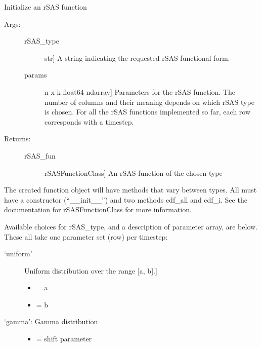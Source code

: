 \documentclass[letterpaper,10pt,english]{sphinxmanual}
\begin{document}

\begin{fulllineitems}
\label{index:rsas.create_function}
Initialize an rSAS function
\begin{description}
\item[{Args:}] \leavevmode\begin{description}
\item[{rSAS\_type}] \leavevmode{[}str{]}
A string indicating the requested rSAS functional form.

\item[{params}] \leavevmode{[}n x k float64 ndarray{]}
Parameters for the rSAS function. The number of columns and 
their meaning depends on which rSAS type is chosen. For all the rSAS 
functions implemented so far, each row corresponds with a timestep.

\end{description}

\item[{Returns:}] \leavevmode\begin{description}
\item[{rSAS\_fun}] \leavevmode{[}rSASFunctionClass{]}
An rSAS function of the chosen type

\end{description}

\end{description}

The created function object will have methods that vary between types. All
must have a constructor (``\_\_init\_\_'') and two methods cdf\_all and cdf\_i. See
the documentation for rSASFunctionClass for more information.

Available choices for rSAS\_type, and a description of parameter array, are below.
These all take one parameter set (row) per timestep:
\begin{description}
\item[{`uniform'}] \leavevmode{[}Uniform distribution over the range {[}a, b{]}.{]}\begin{itemize}
\item {} 
 = a

\item {} 
 = b

\end{itemize}

\item[{`gamma': Gamma distribution}] \leavevmode\begin{itemize}
\item {} 
 = shift parameter


\end{itemize}
\end{description}
\end{fulllineitems}
\end{document}
